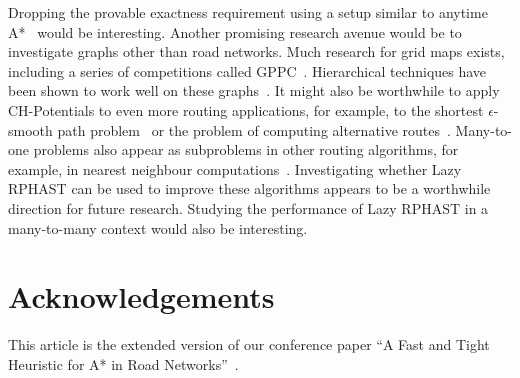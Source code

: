 \documentclass[manuscript]{acmart}
\begin{document}
Dropping the provable exactness requirement using a setup similar to anytime A*~\cite{DBLP:conf/aaai/ZhouH02,DBLP:conf/nips/LikhachevGT03} would be interesting.
Another promising research avenue would be to investigate graphs other than road networks.
Much research for grid maps exists, including a series of competitions called GPPC~\cite{DBLP:conf/socs/SturtevantTTUKS15}.
Hierarchical techniques have been shown to work well on these graphs~\cite{DBLP:conf/aaai/UrasK14}.
It might also be worthwhile to apply CH-Potentials to even more routing applications, for example, to the shortest $\epsilon$-smooth path problem~\cite{dss-tarrn-18} or the problem of computing alternative routes~\cite{adgw-arrn-13,bdgs-argrn-11,kobitzsch2015alternative}.
Many-to-one problems also appear as subproblems in other routing algorithms, for example, in nearest neighbour computations~\cite{buchhold_et_al:LIPIcs.SEA.2021.18}.
Investigating whether Lazy RPHAST can be used to improve these algorithms appears to be a worthwhile direction for future research.
Studying the performance of Lazy RPHAST in a many-to-many context would also be interesting.

\section*{Acknowledgements}
This article is the extended version of our conference paper ``A Fast and Tight Heuristic for A* in Road Networks''~\cite{strasser_et_al:LIPIcs.SEA.2021.6}.








\end{document}
